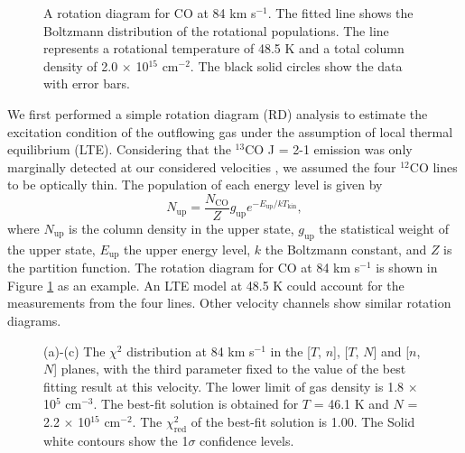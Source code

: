 \begin{figure}[tbp]
\caption{A rotation diagram for CO at 84 km s$^{-1}$. The fitted line shows the Boltzmann distribution of the rotational populations. The line represents a rotational temperature of 48.5 K and a total column density of 2.0 $\times$ 10$^{15}$ cm$^{-2}$. The black solid circles show the data with error bars. \label{fig:figrd}}
\end{figure}

We first performed a simple rotation diagram (RD) analysis \citep{1999ApJ...517..209G} to estimate the excitation condition of the outflowing gas under the assumption of local thermal equilibrium (LTE). Considering that the $^{13}$CO J = 2-1 emission was only marginally detected at our considered velocities \citep{2009ApJ...696...66Q}, we assumed the four $^{12}$CO lines to be optically thin. The population of each energy level is given by 
\begin{equation}
N_{\mathrm{up}} = \frac{N_\mathrm{CO}}{Z} g_\mathrm{up} e^{-E_\mathrm{up}/kT_\mathrm{kin}},
\end{equation}
where $N_\mathrm{up}$ is the column density in the upper state, $g_\mathrm{up}$ the statistical weight of the upper state, $E_\mathrm{up}$ the upper energy level, $k$ the Boltzmann constant, and $Z$ is the partition function. The rotation diagram for CO at 84 km s$^{-1}$ is shown in Figure \ref{fig:figrd} as an example. An LTE model at 48.5 K could account for the measurements from the four lines. Other velocity channels show similar rotation diagrams.


\begin{figure}[!tbp]
\caption{(a)-(c) The $\chi^2$ distribution at 84 km s$^{-1}$ in the [$T$, $n$], [$T$, $N$] and [$n$, $N$] planes, with the third parameter fixed to the value of the best fitting result at this velocity. The lower limit of gas density is 1.8 $\times$ 10$^{5}$ cm$^{-3}$. The best-fit solution is obtained for $T$ =  46.1 K and $N$ = 2.2 $\times$ 10$^{15}$ cm$^{-2}$. The $\chi^2_{\mathrm{red}}$ of the best-fit solution is 1.00. The Solid white contours show the 1$\sigma$ confidence levels. \label{fig:figchi}}
\end{figure}

